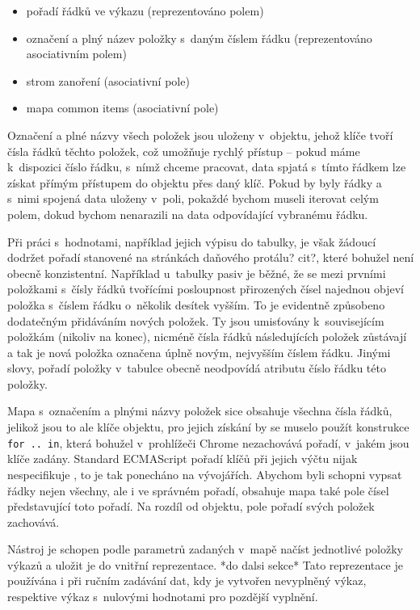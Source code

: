 \begin{itemize}
\item pořadí řádků ve výkazu (reprezentováno polem)
\item označení a plný název položky s~daným číslem řádku (reprezentováno asociativním polem)
\item strom zanoření (asociativní pole)
\item mapa common items (asociativní pole)
\end{itemize} 

Označení a plné názvy všech položek jsou uloženy v~objektu, jehož klíče tvoří čísla řádků těchto položek, což umožňuje rychlý přístup -- pokud máme k~dispozici číslo řádku, s~nímž chceme pracovat, data spjatá s~tímto řádkem lze získat přímým přístupem do objektu přes daný klíč. Pokud by byly řádky a s~nimi spojená data uloženy v~poli, pokaždé bychom museli iterovat celým polem, dokud bychom nenarazili na data odpovídající vybranému řádku.

Při práci s~hodnotami, například jejich výpisu do tabulky, je však žádoucí dodržet pořadí stanovené na stránkách daňového protálu? cit?, které bohužel není obecně konzistentní. Například u~tabulky pasiv je běžné, že se mezi prvními položkami s~čísly řádků tvořícími posloupnost přirozených čísel najednou objeví položka s~číslem řádku o~několik desítek vyšším. To je evidentně způsobeno dodatečným přidáváním nových položek. Ty jsou umisťovány k~souvisejícím položkám (nikoliv na konec), nicméně čísla řádků následujících položek zůstávají a tak je nová položka označena úplně novým, nejvyšším číslem řádku. Jinými slovy, pořadí položky v~tabulce obecně neodpovídá atributu číslo řádku této položky. 

Mapa s~označením a plnými názvy položek sice obsahuje všechna čísla řádků, jelikož jsou to ale klíče objektu, pro jejich získání by se muselo použít konstrukce \texttt{for .. in}, která bohužel v~prohlížeči Chrome nezachovává pořadí, v~jakém jsou klíče zadány. Standard ECMAScript pořadí klíčů při jejich výčtu nijak nespecifikuje \cite{proporder}, to je tak ponecháno na vývojářích. Abychom byli schopni vypsat řádky nejen všechny, ale i ve správném pořadí, obsahuje mapa také pole čísel představující toto pořadí. Na rozdíl od objektu, pole pořadí svých položek zachovává.

Nástroj je schopen podle parametrů zadaných v~mapě načíst jednotlivé položky výkazů a uložit je do vnitřní reprezentace. *do dalsi sekce* Tato reprezentace je používána i při ručním zadávání dat, kdy je vytvořen nevyplněný výkaz, respektive výkaz s~nulovými hodnotami pro pozdější vyplnění. 

